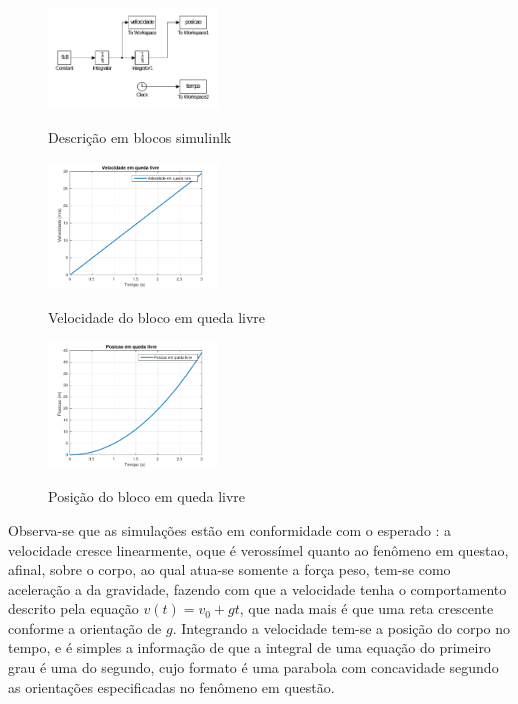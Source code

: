 \documentclass[DIV=calc, paper=a4, fontsize=11pt, twocolumn]{scrartcl}	 %
\begin{document}
\begin{figure}[h!]
\centering
\includegraphics[width=0.4\textwidth]{queda_livre_sem_resistencia_}
\label{fig:queda_livre_sem_resistencia_}
\caption{Descrição em blocos simulinlk}
\end{figure}

\begin{figure}[h!]
\centering
\includegraphics[width=0.4\textwidth]{velocidade_queda_livre}
\label{fig:velocidade_queda_livre}
\caption{Velocidade do bloco em queda livre}
\end{figure}

\begin{figure}[h!]
\centering
\includegraphics[width=0.4\textwidth]{posicao_queda_livre}
\label{fig:posicao_queda_livre}
\caption{Posição do bloco em queda livre}
\end{figure}

Observa-se que as simulações estão em conformidade com o esperado : a velocidade cresce linearmente, oque é verossímel quanto ao fenômeno em questao, afinal, sobre o
corpo, ao qual atua-se somente a força peso, tem-se como aceleração a da gravidade, fazendo com que a velocidade tenha o comportamento descrito pela equação
$ v(t)= v_{0}+gt $, que nada mais é que uma reta crescente conforme a orientação de $g$. Integrando a velocidade tem-se a posição do corpo no tempo, e é simples a informação
de que a integral de uma equação do primeiro grau é uma do segundo, cujo formato é uma parabola com concavidade segundo as orientações especificadas no fenômeno em questão.
\end{document}
